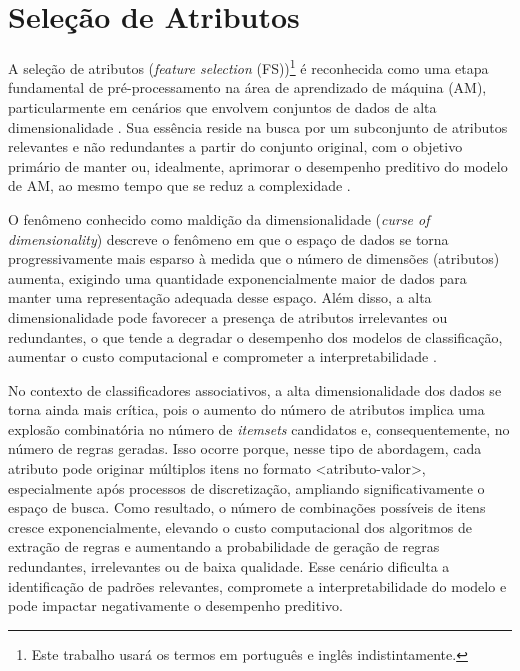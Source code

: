\section{Seleção de Atributos}\label{sec:fs} 

A seleção de atributos (\textit{feature selection} (FS))\footnote{Este trabalho usará os termos em português e inglês indistintamente.} é reconhecida como uma etapa fundamental de pré-processamento na área de aprendizado de máquina (AM), particularmente em cenários que envolvem conjuntos de dados de alta dimensionalidade \cite{Dhal2022,10.1007/978-3-031-23092-9_12,BARBIERI2024123667}. Sua essência reside na busca por um subconjunto de atributos relevantes e não redundantes a partir do conjunto original, com o objetivo primário de manter ou, idealmente, aprimorar o desempenho preditivo do modelo de AM, ao mesmo tempo que se reduz a complexidade \cite{Theng2024,Emmoh2024}.

O fenômeno conhecido como maldição da dimensionalidade (\textit{curse of dimensionality}) descreve o fenômeno em que o espaço de dados se torna progressivamente mais esparso à medida que o número de dimensões (atributos) aumenta, exigindo uma quantidade exponencialmente maior de dados para manter uma representação adequada desse espaço. Além disso, a alta dimensionalidade pode favorecer a presença de atributos irrelevantes ou redundantes, o que tende a degradar o desempenho dos modelos de classificação, aumentar o custo computacional e comprometer a interpretabilidade \cite{EBRAHIMIWARKIANI2025129372,Bouchlaghem2022}.

No contexto de classificadores associativos, a alta dimensionalidade dos dados se torna ainda mais crítica, pois o aumento do número de atributos implica uma explosão combinatória no número de \textit{itemsets} candidatos e, consequentemente, no número de regras geradas. Isso ocorre porque, nesse tipo de abordagem, cada atributo pode originar múltiplos itens no formato <atributo-valor>, especialmente após processos de discretização, ampliando significativamente o espaço de busca. Como resultado, o número de combinações possíveis de itens cresce exponencialmente, elevando o custo computacional dos algoritmos de extração de regras e aumentando a probabilidade de geração de regras redundantes, irrelevantes ou de baixa qualidade. Esse cenário dificulta a identificação de padrões relevantes, compromete a interpretabilidade do modelo e pode impactar negativamente o desempenho preditivo.

